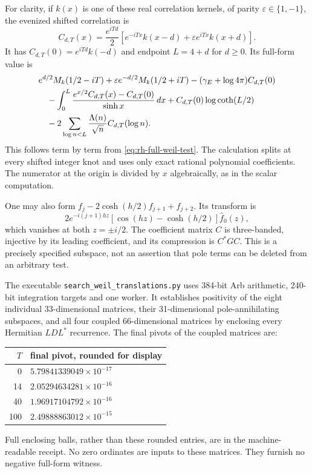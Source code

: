 For clarity, if $k(x)$ is one of these real correlation kernels, of
parity $\varepsilon\in\{1,-1\}$, the evenized shifted correlation is
\[
 C_{d,T}(x)=\frac{e^{iTd}}2
 \left[e^{-iTx}k(x-d)+\varepsilon e^{iTx}k(x+d)\right].
 \]
It has $C_{d,T}(0)=e^{iTd}k(-d)$ and endpoint $L=4+d$ for $d\ge0$.
Its full-form value is
\begin{align}
 &e^{d/2}M_k(1/2-iT)+
     \varepsilon e^{-d/2}M_k(1/2+iT)
  -(\gamma_E+\log4\pi)C_{d,T}(0)\notag\\
 &\quad-\int_0^L
 \frac{e^{x/2}C_{d,T}(x)-C_{d,T}(0)}{\sinh x}\,dx
 +C_{d,T}(0)\log\coth(L/2)\notag\\
 &\quad-2\sum_{\log n<L}\frac{\Lambda(n)}{\sqrt n}
       C_{d,T}(\log n).
 \label{eq:rh-general-shifted-entry}
\end{align}
This follows term by term from \eqref{eq:rh-full-weil-test}.
The calculation splits at every shifted integer knot and uses only
exact rational polynomial coefficients. The numerator at the origin
is divided by $x$ algebraically, as in the scalar computation.

One may also form $f_j-2\cosh(h/2)f_{j+1}+f_{j+2}$.
Its transform is
\[
 2e^{-i(j+1)hz}[\cos(hz)-\cosh(h/2)]\widehat f_0(z),
\]
which vanishes at both $z=\pm i/2$. The coefficient matrix $C$ is
three-banded, injective by its leading coefficient, and its compression
is $C^*GC$. This is a precisely specified subspace, not an assertion
that pole terms can be deleted from an arbitrary test.

The executable \texttt{search\_weil\_translations.py} uses 384-bit
Arb arithmetic, 240-bit integration targets and one worker.
It establishes positivity of the eight individual 33-dimensional
matrices, their 31-dimensional pole-annihilating subspaces, and all
four coupled 66-dimensional matrices by enclosing every Hermitian
$LDL^*$ recurrence. The final pivots of the coupled matrices are:
\begin{center}
\begin{tabular}{rl}
\toprule
$T$ & final pivot, rounded for display\\
\midrule
0 & $5.79841339049\times10^{-17}$\\
14 & $2.05294634281\times10^{-16}$\\
40 & $1.96917104792\times10^{-16}$\\
100 & $2.49888863012\times10^{-15}$\\
\bottomrule
\end{tabular}
\end{center}
Full enclosing balls, rather than these rounded entries, are in the
machine-readable receipt. No zero ordinates are inputs to these matrices.
They furnish no negative full-form witness.

